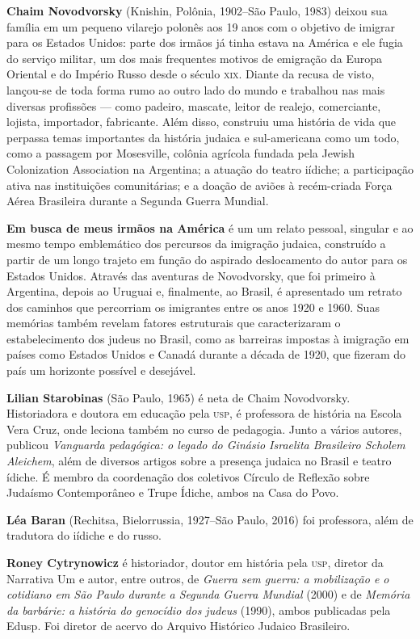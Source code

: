 \textbf{Chaim Novodvorsky} (Knishin, Polônia, 1902--São Paulo, 1983) deixou sua família em um pequeno vilarejo polonês aos 19 anos com o objetivo de imigrar para os Estados Unidos: parte dos irmãos já tinha estava na América e ele fugia do serviço militar, um dos mais frequentes motivos de emigração da Europa Oriental e do Império Russo desde o século \textsc{xix}. Diante da recusa de visto, lançou-se de toda forma rumo ao outro lado do mundo e trabalhou nas mais diversas profissões --- como padeiro, mascate, leitor de realejo, comerciante, lojista, importador, fabricante. Além disso, construiu uma história de vida que perpassa temas importantes da história judaica e sul-americana como um todo, como a passagem por Mosesville, colônia agrícola fundada pela Jewish Colonization Association na Argentina; a atuação do teatro iídiche; a participação ativa nas instituições comunitárias; e a doação de aviões à recém-criada Força Aérea Brasileira durante a Segunda Guerra Mundial.

\textbf{Em busca de meus irmãos na América} é um um relato pessoal, singular e ao mesmo tempo emblemático dos percursos da imigração judaica, construído a partir de um longo trajeto em função do aspirado deslocamento do autor para os Estados Unidos. Através das aventuras de Novodvorsky, que foi primeiro à Argentina, depois ao Uruguai e, finalmente, ao Brasil, é apresentado um retrato dos caminhos que percorriam os imigrantes entre os anos 1920 e 1960. Suas memórias também revelam fatores estruturais que caracterizaram o estabelecimento dos judeus no Brasil, como as barreiras impostas à imigração em países como Estados Unidos e Canadá durante a década de 1920, que fizeram do país um horizonte possível e desejável.

\pagebreak

\textbf{Lilian Starobinas} (São Paulo, 1965) é neta de Chaim Novodvorsky. Historiadora e doutora em educação pela \textsc{usp}, é professora de história na Escola Vera Cruz, onde leciona também no curso de pedagogia. Junto a vários autores, publicou \textit{Vanguarda pedagógica: o legado do Ginásio Israelita Brasileiro Scholem Aleichem}, além de diversos artigos sobre a presença judaica no Brasil e teatro ídiche. É membro da coordenação dos coletivos Círculo de Reflexão sobre Judaísmo Contemporâneo e Trupe Ídiche, ambos na Casa do Povo. 

\textbf{Léa Baran} (Rechitsa, Bielorrussia, 1927--São Paulo, 2016) foi professora, além de tradutora do iídiche e do russo.

\textbf{Roney Cytrynowicz} é historiador, doutor em história pela \textsc{usp}, diretor da Narrativa Um e autor, entre outros, de \textit{Guerra sem guerra: a mobilização e o cotidiano em São Paulo durante a Segunda Guerra Mundial} (2000) e de \textit{Memória da barbárie: a história do genocídio dos judeus} (1990), ambos publicadas pela Edusp. Foi diretor de acervo do Arquivo Histórico Judaico Brasileiro.




